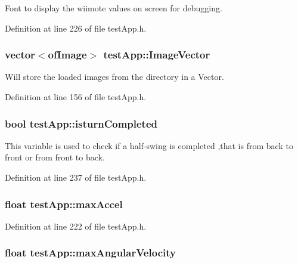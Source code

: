 Font to display the wiimote values on screen for debugging. 



Definition at line 226 of file test\-App.\-h.

\hypertarget{classtest_app_ad4de5d6e6e8f3b8bb7424e62792deb1f}{
\subsubsection[{Image\-Vector}]{\setlength{\rightskip}{0pt plus 5cm}vector$<$of\-Image$>$ test\-App\-::\-Image\-Vector}}\label{classtest_app_ad4de5d6e6e8f3b8bb7424e62792deb1f}


Will store the loaded images from the directory in a Vector. 



Definition at line 156 of file test\-App.\-h.

\hypertarget{classtest_app_a42478a80a90ce9f663c04bcdaea5c5bd}{
\subsubsection[{isturn\-Completed}]{\setlength{\rightskip}{0pt plus 5cm}bool test\-App\-::isturn\-Completed}}\label{classtest_app_a42478a80a90ce9f663c04bcdaea5c5bd}


This variable is used to check if a half-\/swing is completed ,that is from back to front or from front to back. 



Definition at line 237 of file test\-App.\-h.

\hypertarget{classtest_app_a34e834a5e4d359700147a74eece8eed1}{
\subsubsection[{max\-Accel}]{\setlength{\rightskip}{0pt plus 5cm}float test\-App\-::max\-Accel}}\label{classtest_app_a34e834a5e4d359700147a74eece8eed1}


Definition at line 222 of file test\-App.\-h.

\hypertarget{classtest_app_ab9565e8e6dc748ef68e6845f5f94cae9}{
\subsubsection[{max\-Angular\-Velocity}]{\setlength{\rightskip}{0pt plus 5cm}float test\-App\-::max\-Angular\-Velocity}}\label{classtest_app_ab9565e8e6dc748ef68e6845f5f94cae9}



